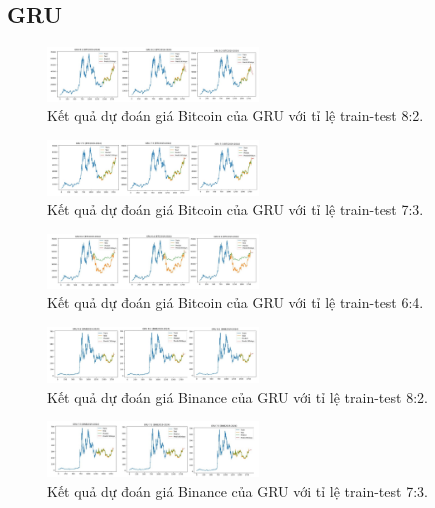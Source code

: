 \documentclass{ieeeojies}
\begin{document}
\subsection{GRU}
\begin{figure}[h]
    \centering
    \includegraphics[width=0.5\textwidth]{bibliography/pictures/BTC_GRU_82.jpg}
    \caption{Kết quả dự đoán giá Bitcoin của GRU với tỉ lệ train-test 8:2.}
\end{figure}
\begin{figure}[h]
    \centering
    \includegraphics[width=0.5\textwidth]{bibliography/pictures/BTC_GRU_73.jpg}
    \caption{Kết quả dự đoán giá Bitcoin của GRU với tỉ lệ train-test 7:3.}
\end{figure}
\begin{figure}[h]
    \centering
    \includegraphics[width=0.5\textwidth]{bibliography/pictures/BTC_GRU_64.jpg}
    \caption{Kết quả dự đoán giá Bitcoin của GRU với tỉ lệ train-test 6:4.}
\end{figure}
\begin{figure}[h]
    \centering
    \includegraphics[width=0.5\textwidth]{bibliography/pictures/BNB_GRU_82.jpg}
    \caption{Kết quả dự đoán giá Binance của GRU với tỉ lệ train-test 8:2.}
\end{figure}
\begin{figure}[h]
    \centering
    \includegraphics[width=0.5\textwidth]{bibliography/pictures/BNB_GRU_73.jpg}
    \caption{Kết quả dự đoán giá Binance của GRU với tỉ lệ train-test 7:3.}
\end{figure}
\end{document}

